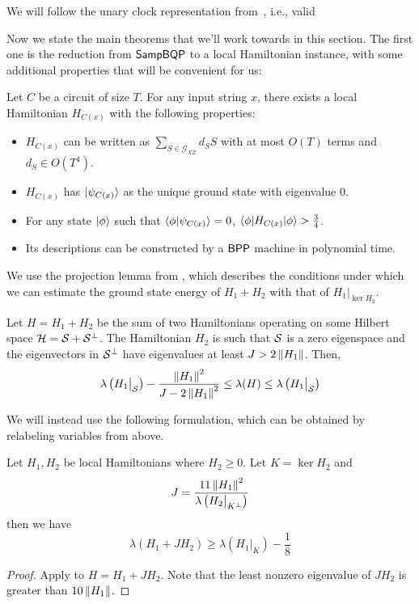 We will follow the unary clock representation from~\cite{kitaev2002classical}, i.e., valid 


Now we state the main theorems that we'll work towards in this section.
The first one is the reduction from $\operatorname{\mathsf{SampBQP}}$ to a local Hamiltonian instance, with some additional properties that will be convenient for us:
\begin{thm}
	\label{thm:LHReduction}
	Let $C$ be a circuit of size $T$. For any input string $x$, there exists a local Hamiltonian $H_{C(x)}$  with the following properties:
	\begin{itemize}
		\item $H_{C(x)}$ can be written as $\sum_{S\in\mathcal{G}_{XZ}} d_S S$ with at most $O(T)$ terms and $d_S\in O(T^4)$.
		\item $H_{C(x)}$ has $\ket{\psi_{C(x)}}$ as the unique ground state with eigenvalue $0$.
		\item For any state $\ket\phi$ such that $\braket{\phi|\psi_{C(x)}}=0$,  $\braket{\phi|H_{C(x)}|\phi}>\frac{3}{4}$.
		\item Its descriptions can be constructed by a $\operatorname{\mathsf{BPP}}$ machine in polynomial time.
	\end{itemize}
\end{thm}




We use the projection lemma from \cite{kempe_kitaev_regev_2006}, which describes the conditions under which we can estimate the ground state energy of $H_1 + H_2$ with that of $H_1\big|_{\ker H_2}$.

\begin{thm}
	\label{thm:proj1}
	Let $H=H_1+H_2$ be the sum of two Hamiltonians operating on some Hilbert space $\mathcal{H}=\mathcal{S}+\mathcal{S}^\bot$.
	The Hamiltonian $H_2$ is such that $\mathcal{S}$ is a zero eigenspace and the eigenvectors in $\mathcal{S}^\bot$ have eigenvalues at least $J>2\left\lVert H_1\right\rVert$. Then,
	$$\lambda\left(H_1\big|_{\mathcal{S}}\right)-\frac{\left\lVert H_1\right\rVert^2}{J-2\left\lVert H_1\right\rVert^2}\leq\lambda(H)\leq\lambda\left(H_1\big|_{\mathcal{S}}\right)$$
\end{thm}

We will instead use the following formulation, which can be obtained by relabeling variables from above.

\begin{thm}
	\label{thm:projection}
	Let $H_1, H_2$ be local Hamiltonians where $H_2\geq0$. Let $K=\ker H_2$ and
	$$J=\frac{11\left\lVert H_1\right\rVert^2}{\lambda\left(H_2\big|_{K^\bot}\right)}$$
	then we have
	$$\lambda(H_1+JH_2)\geq\lambda\left(H_1\big|_K\right)-\frac{1}{8}$$
\end{thm}
\begin{proof}
	Apply  to $H=H_1+JH_2$. Note that the least nonzero eigenvalue of $JH_2$ is greater than $10\left\lVert H_1\right\rVert$.
\end{proof}


